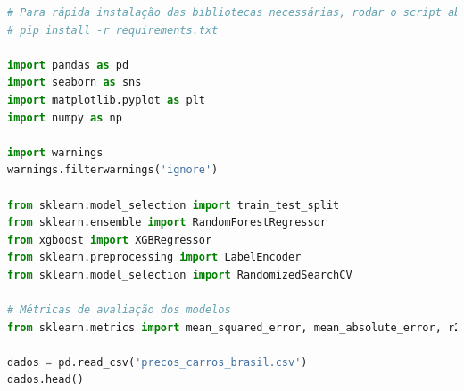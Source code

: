 
\begin{lstlisting}[language=Python, style=input]
# Para rápida instalação das bibliotecas necessárias, rodar o script abaixo no CLI:
# pip install -r requirements.txt

import pandas as pd
import seaborn as sns
import matplotlib.pyplot as plt
import numpy as np

import warnings
warnings.filterwarnings('ignore')

from sklearn.model_selection import train_test_split
from sklearn.ensemble import RandomForestRegressor
from xgboost import XGBRegressor
from sklearn.preprocessing import LabelEncoder
from sklearn.model_selection import RandomizedSearchCV

# Métricas de avaliação dos modelos
from sklearn.metrics import mean_squared_error, mean_absolute_error, r2_score

dados = pd.read_csv('precos_carros_brasil.csv')
dados.head()
\end{lstlisting}

